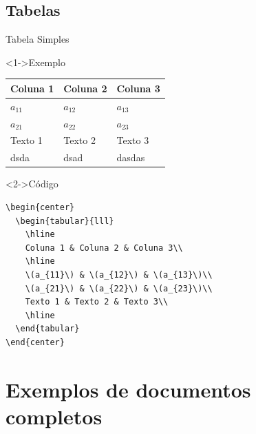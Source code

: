 \documentclass[bigger]{beamer}
\begin{document}
\subsection{Tabelas}
\label{sec:org9189f65}
\begin{frame}[label={sec:org5add3e0},fragile]{Tabela Simples}
 \begin{block}<1->{Exemplo}
\begin{center}
\begin{tabular}{lll}
\hline
Coluna 1 & Coluna 2 & Coluna 3\\
\hline
\(a_{11}\) & \(a_{12}\) & \(a_{13}\)\\
\(a_{21}\) & \(a_{22}\) & \(a_{23}\)\\
Texto 1 & Texto 2 & Texto 3\\
dsda & dsad & dasdas\\
\hline
\end{tabular}
\end{center}
\end{block}

\begin{block}<2->{Código}
\begin{verbatim}
\begin{center}
  \begin{tabular}{lll}
    \hline
    Coluna 1 & Coluna 2 & Coluna 3\\
    \hline
    \(a_{11}\) & \(a_{12}\) & \(a_{13}\)\\
    \(a_{21}\) & \(a_{22}\) & \(a_{23}\)\\
    Texto 1 & Texto 2 & Texto 3\\
    \hline
  \end{tabular}
\end{center}
\end{verbatim}
\end{block}
\end{frame}
\section{Exemplos de documentos completos}
\label{sec:org779b5d1}
\end{document}
